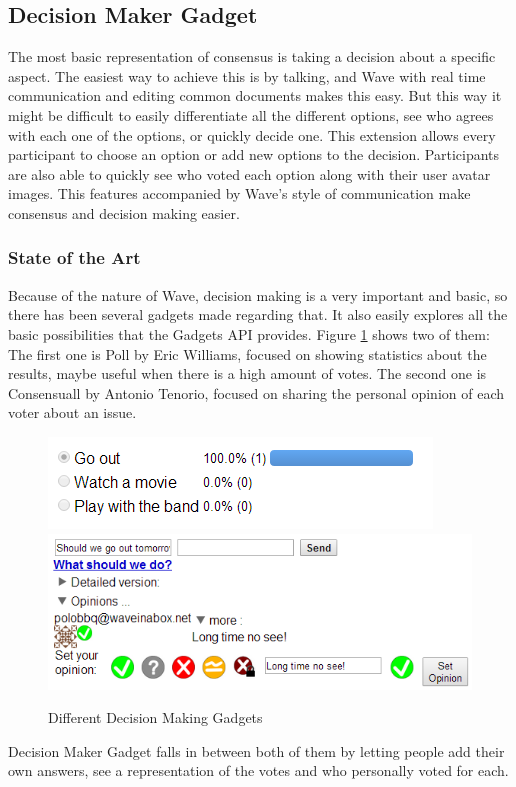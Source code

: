 \subsection{Decision Maker Gadget}
The most basic representation of consensus is taking a decision about a specific aspect. The easiest way to achieve this is by talking, and Wave with real time communication and editing common documents makes this easy. But this way it might be difficult to easily differentiate all the different options, see who agrees with each one of the options, or quickly decide one. This extension allows every participant to choose an option or add new options to the decision. Participants are also able to quickly see who voted each option along with their user avatar images. This features accompanied by Wave's style of communication make consensus and decision making easier.

\subsubsection{State of the Art}
Because of the nature of Wave, decision making is a very important and basic, so there has been several gadgets made regarding that. It also easily explores all the basic possibilities that the Gadgets API provides. Figure \ref{fig:decision_gadgets} shows two of them: The first one is Poll by Eric Williams, focused on showing statistics about the results, maybe useful when there is a high amount of votes. The second one is Consensuall by Antonio Tenorio, focused on sharing the personal opinion of each voter about an issue.
\begin{figure}[H]
  \center
    \includegraphics[keepaspectratio, scale=0.7]{Media/Captures/Extensions/DecisionGadgets/other.png}
    \includegraphics[keepaspectratio, scale=0.7]{Media/Captures/Extensions/DecisionGadgets/consensuall.png}
  \caption{Different Decision Making Gadgets}
  \label{fig:decision_gadgets}
\end{figure}
Decision Maker Gadget falls in between both of them by letting people add their own answers, see a representation of the votes and who personally voted for each.

